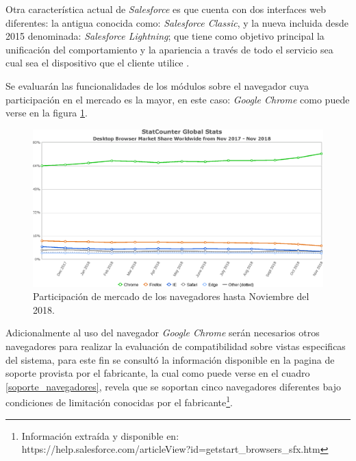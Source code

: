 Otra característica actual de \emph{Salesforce} es que cuenta con dos interfaces
web diferentes: la antigua conocida como: \emph{Salesforce Classic}, y la nueva
incluida desde 2015 denominada: \emph{Salesforce Lightning}; que tiene como
objetivo principal la unificación del comportamiento y la apariencia a través de
todo el servicio sea cual sea el dispositivo que el cliente
utilice \cite{McCarthy}.

Se evaluarán las funcionalidades de los módulos sobre el navegador cuya
participación en el mercado es la mayor, en este caso: \emph{Google Chrome}
como puede verse en la figura \ref{software}.

\begin{figure}
\centering
\includegraphics[width=1.0\textwidth]{graphics/compatibilidad.eps}
\caption{Participación de mercado de los navegadores hasta Noviembre del 2018.}
\label{software}
\end{figure}

Adicionalmente al uso del navegador \emph{Google Chrome} serán necesarios
otros navegadores para realizar la evaluación de compatibilidad sobre
vistas especificas del sistema, para este fin se consultó la información
disponible en la pagina de soporte provista por el fabricante, la cual como
puede verse en el cuadro \ref{soporte_navegadores}, revela que se soportan
cinco navegadores diferentes bajo condiciones de limitación conocidas por el
fabricante\footnote{Información extraída y disponible en:
https://help.salesforce.com/articleView?id=getstart\_browsers\_sfx.htm}.

